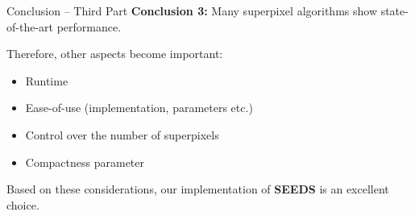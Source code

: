 \documentclass[handout]{beamer}
\begin{document}
	\begin{frame}{Conclusion -- Third Part}
		\textbf{Conclusion 3:} Many superpixel algorithms show state-of-the-art performance.
		\vskip 0.25cm
		
		Therefore, other aspects become important:
		\vskip 0.25cm
		\begin{itemize}[label=--]
			\item Runtime
			\item Ease-of-use (implementation, parameters etc.)
			\item Control over the number of superpixels
			\item Compactness parameter
		\end{itemize}
		\vskip 0.5cm
		\pause
		
		Based on these considerations, our implementation of \textbf{SEEDS} is an excellent choice.
	\end{frame}
\end{document}
